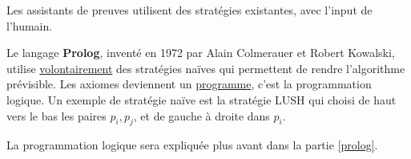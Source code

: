 Les assistants de preuves utilisent des stratégies existantes, avec l'input de l'humain.

Le langage \textbf{Prolog}, inventé en 1972 par Alain Colmerauer et Robert Kowalski, utilise \underline{volontairement} des stratégies naïves qui permettent de rendre l'algorithme prévisible. Les axiomes deviennent un \underline{programme}, c'est la programmation logique. Un exemple de stratégie naïve est la stratégie LUSH qui choisi de haut vers le bas les paires $p_i, p_j$, et de gauche à droite dans $p_i$.

La programmation logique sera expliquée plus avant dans la partie \ref{prolog}.